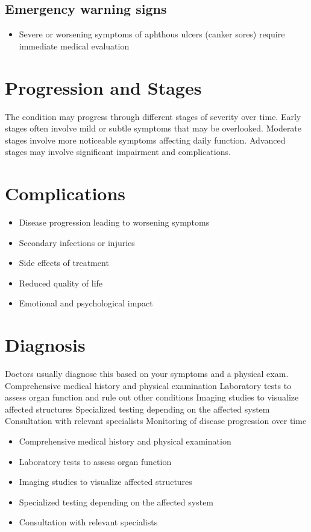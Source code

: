 \subsection{Emergency warning signs}
\begin{itemize}[noitemsep]
  \item Severe or worsening symptoms of aphthous ulcers (canker sores) require immediate medical evaluation
\end{itemize}
\section{Progression and Stages}
The condition may progress through different stages of severity over time. Early stages often involve mild or subtle symptoms that may be overlooked. Moderate stages involve more noticeable symptoms affecting daily function. Advanced stages may involve significant impairment and complications.
\section{Complications}
\begin{itemize}[noitemsep]
  \item Disease progression leading to worsening symptoms
  \item Secondary infections or injuries
  \item Side effects of treatment
  \item Reduced quality of life
  \item Emotional and psychological impact
\end{itemize}
\section{Diagnosis}
Doctors usually diagnose this based on your symptoms and a physical exam. Comprehensive medical history and physical examination Laboratory tests to assess organ function and rule out other conditions Imaging studies to visualize affected structures Specialized testing depending on the affected system Consultation with relevant specialists Monitoring of disease progression over time

\begin{itemize}[noitemsep]
  \item Comprehensive medical history and physical examination
  \item Laboratory tests to assess organ function
  \item Imaging studies to visualize affected structures
  \item Specialized testing depending on the affected system
  \item Consultation with relevant specialists
\end{itemize}
